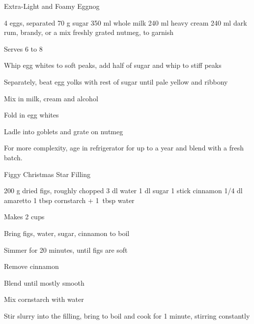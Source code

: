 
\begin{recipe}{Extra-Light and Foamy Eggnog}{}
\begin{ingredients}
4 eggs, separated
70 g sugar
350 ml whole milk
240 ml heavy cream
240 ml dark rum, \ibreak brandy, or a mix
freshly grated nutmeg, to garnish
\end{ingredients}
\nextcolumn
Serves 6 to 8
\begin{steps}
    \item Whip egg whites to soft peaks, add half of sugar and whip to stiff peaks
    \item Separately, beat egg yolks with rest of sugar until pale yellow and ribbony
    \item Mix in milk, cream and alcohol
    \item Fold in egg whites
    \item Ladle into goblets and grate on nutmeg
\end{steps}
For more complexity, age in refrigerator for up to a year and blend with a fresh batch.
\end{recipe}

\begin{recipe}{Figgy Christmas Star Filling}{}
\begin{ingredients}
200 g dried figs, \ibreak roughly chopped
3 dl water
1 dl sugar
1 stick cinnamon
1/4 dl amaretto
1 tbsp cornstarch + 1~tbsp water
\end{ingredients}
\nextcolumn
Makes 2 cups
\begin{steps}
    \item Bring figs, water, sugar, cinnamon to boil
    \item Simmer for 20 minutes, until figs are soft
    \item Remove cinnamon
    \item Blend until mostly smooth
    \item Mix cornstarch with water
    \item Stir slurry into the filling, bring to boil and cook for 1 minute, stirring constantly
\end{steps}
\end{recipe}

